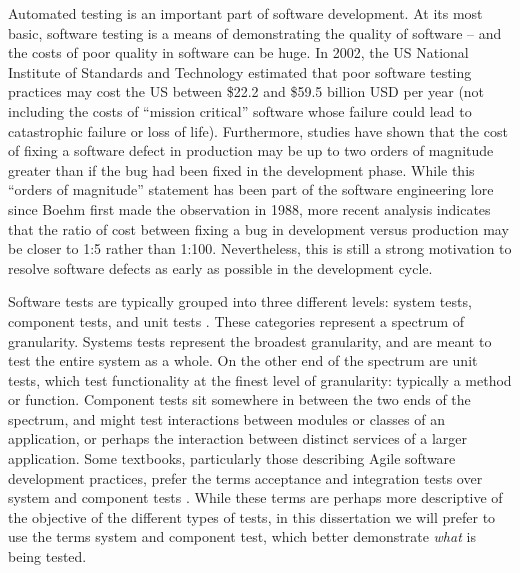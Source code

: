Automated testing is an important part of software development. At its
most basic, software testing is a means of demonstrating the quality
of software -- and the costs of poor quality in software can be
huge. In 2002, the US National Institute of Standards and Technology
estimated that poor software testing practices may cost the US between
\$22.2 and \$59.5 billion USD per year (not including the costs of
``mission critical'' software whose failure could lead to catastrophic
failure or loss of life). Furthermore, studies have shown that the
cost of fixing a software defect in production may be up to two orders
of magnitude greater than if the bug had been fixed in the development
phase. \cite{mcconnell:code} \cite{boehm:understanding} While this
``orders of magnitude'' statement has been part of the software
engineering lore since Boehm first made the observation in 1988, more
recent analysis \cite{boehm:software} \cite{bossavit:leprechauns}
indicates that the ratio of cost between fixing a bug in development
versus production may be closer to 1:5 rather than
1:100. Nevertheless, this is still a strong motivation to resolve
software defects as early as possible in the development cycle.








Software tests are typically grouped into three different levels:
system tests, component tests, and unit tests
\cite{ieee:glossary}. These categories represent a spectrum of
granularity. Systems tests represent the broadest granularity, and are
meant to test the entire system as a whole. On the other end of the
spectrum are unit tests, which test functionality at the finest level
of granularity: typically a method or function. Component tests sit
somewhere in between the two ends of the spectrum, and might test
interactions between modules or classes of an application, or perhaps
the interaction between distinct services of a larger
application. Some textbooks, particularly those describing Agile
software development practices, prefer the terms acceptance and
integration tests over system and component tests
\cite{freeman:growing} \cite{humble:continuous}. While these terms are
perhaps more descriptive of the objective of the different types of
tests, in this dissertation we will prefer to use the terms system and
component test, which better demonstrate {\em what} is being tested.

